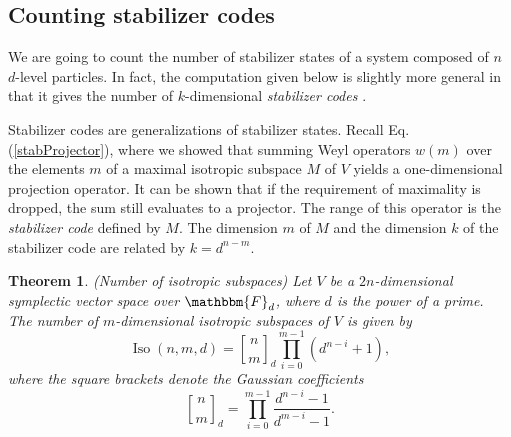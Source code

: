 \documentclass[aps,twocolumn,floatfix]{revtex4}
\newtheorem{theorem}{Theorem}
\def\Gauss#1,#2.{{#1\brack#2}_d}
\def\FF{\mathbbm{F}}
\DeclareMathOperator{\Iso}{Iso}
\begin{document}
\subsection{Counting stabilizer codes}

We are going to count the number of stabilizer states of a system
composed of $n$ $d$-level particles. In fact, the computation given
below is slightly more general in that it gives the number of
$k$-dimensional \emph{stabilizer codes} \cite{gottesman}. 

Stabilizer codes are generalizations of stabilizer states. Recall Eq.
(\ref{stabProjector}), where we showed that summing Weyl operators
$w(m)$ over the elements $m$ of a maximal isotropic subspace $M$ of
$V$ yields a one-dimensional projection operator.  It can be shown
that if the requirement of maximality is dropped, the sum still
evaluates to a projector. The range of this operator is the
\emph{stabilizer code} defined by $M$. The dimension $m$ of $M$ and
the dimension $k$ of the stabilizer code are related by $k=d^{n-m}$.

\begin{theorem}
	\emph{(Number of isotropic subspaces)}
	Let $V$ be a $2n$-dimensional symplectic vector space over $\FF_d$,
	where $d$ is the power of a prime. The number of $m$-dimensional
	isotropic subspaces of $V$ is given by
	\begin{equation*}
		\Iso(n,m,d) = \Gauss n,m. \prod_{i=0}^{m-1} (d^{n-i}+1),
	\end{equation*}
	where the square brackets denote the \emph{Gaussian coefficients}
	\begin{equation*}
		\Gauss n,m.=
		\prod_{i=0}^{m-1} \frac{d^{n-i}-1}{d^{m-i}-1}.
	\end{equation*}
\end{theorem}
\end{document}
